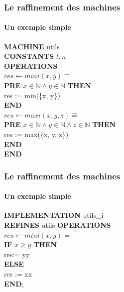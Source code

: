 \documentclass[11pt,a4paper,xcolor=table, handout]{beamer} %
\newcommand{\Bequal}{\mathrel{\widehat{=}}}
\begin{document}
\begin{frame}
\frametitle{Le raffinement des machines}
\framesubtitle{Un exemple simple}
\noindent \textbf{MACHINE} utils \\
\textbf{CONSTANTS} $t,n$ \\
\textbf{OPERATIONS} \\
$res \leftarrow mini(x, y) \Bequal$ \\
\hspace*{1em}  \textbf{PRE} $x \in \mathbb{N} \wedge  y \in \mathbb{N} $ \textbf{THEN} \\
\hspace*{2em} res := min(\{x, y\})  \\
\hspace*{1em} \textbf{END} \\
$res \leftarrow maxi(x, y, z) \Bequal$ \\
\hspace*{1em}  \textbf{PRE} $x \in \mathbb{N} \wedge  y \in \mathbb{N} \wedge z \in \mathbb{N}$ \textbf{THEN} \\
\hspace*{2em} res := max(\{x, y, z\})  \\
\hspace*{1em} \textbf{END} \\
\textbf{END}
\end{frame}

\begin{frame}
\frametitle{Le raffinement des machines}
\framesubtitle{Un exemple simple}
\noindent \textbf{IMPLEMENTATION}  utils\_i \\
\textbf{REFINES} utils
\textbf{OPERATIONS} \\
$res \leftarrow mini ( x , y ) =$ \\
\hspace*{1em}    \textbf{IF}  $x \geq y$ \textbf{THEN} \\
\hspace*{2em}        res:= yy \\
\hspace*{1em}    \textbf{ELSE} \\
\hspace*{2em}        res := xx \\
\hspace*{1em}    \textbf{END}; \\
\end{frame}
\end{document}
